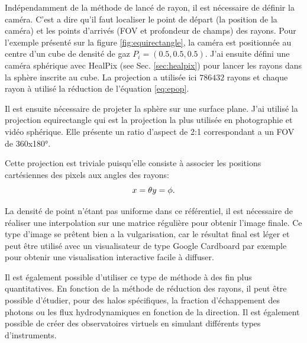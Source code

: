 Indépendamment de la méthode de lancé de rayon, il est nécessaire de définir la caméra.
C'est a dire qu'il faut localiser le point de départ (la position de la caméra) et les points d'arrivés (\ac{FOV} et profondeur de champs) des rayons.
Pour l'exemple présenté sur la figure \ref{fig:equirectangle}, la caméra est positionnée au centre d'un cube de densité de gaz $P_i = (0.5,0.5,0.5)$.
J'ai ensuite défini une caméra sphérique avec HealPix (see Sec. \ref{sec:healpix}) pour lancer les rayons dans la sphère inscrite au cube.
La projection a utilisée ici $786432$ rayons et chaque rayon à utilisé la réduction de l'équation \ref{eq:epop}.

Il est ensuite nécessaire de projeter la sphère sur une surface plane.
J'ai utilisé la projection equirectangle qui est la projection la plus utilisée en photographie et vidéo sphérique.
Elle présente un ratio d'aspect de 2:1 correspondant a un \ac{FOV} de 360x180°.

Cette projection est triviale puisqu'elle consiste à associer les positions cartésiennes des pixels aux angles des rayons:
\begin{equation}
x=\theta\\
y=\phi.
\end{equation}

La densité de point n’étant pas uniforme dans ce référentiel, il est nécessaire de réaliser une interpolation sur une matrice régulière pour obtenir l'image finale.
Ce type d'image se prêtent bien a la vulgarisation, car le résultat final est léger et peut être utilisé avec un visualisateur de type Google Cardboard par exemple pour obtenir une visualisation interactive facile à diffuser.

Il est également possible d'utiliser ce type de méthode à des fin plus quantitatives.
En fonction de la méthode de réduction des rayons, il peut être possible d'étudier, pour des halos spécifiques, la fraction d'échappement des photons ou les flux hydrodynamiques en fonction de la direction. 
Il est également possible de créer des observatoires virtuels en simulant différents types d'instruments.

